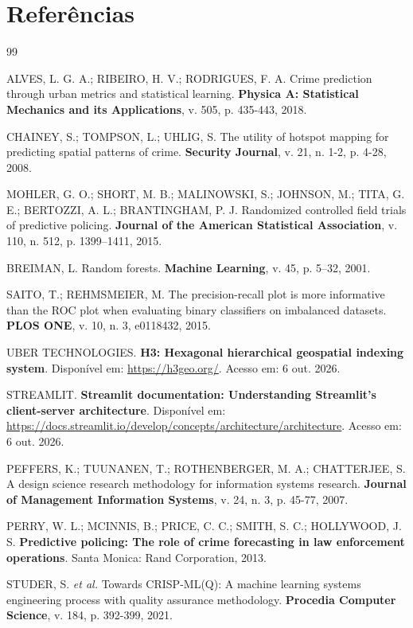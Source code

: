 \documentclass[12pt]{article}
\begin{document}
\section{Referências}

\begin{thebibliography}{99}

ALVES, L. G. A.; RIBEIRO, H. V.; RODRIGUES, F. A. Crime prediction through urban metrics and statistical learning. \textbf{Physica A: Statistical Mechanics and its Applications}, v. 505, p. 435-443, 2018.

CHAINEY, S.; TOMPSON, L.; UHLIG, S. The utility of hotspot mapping for predicting spatial patterns of crime. \textbf{Security Journal}, v. 21, n. 1-2, p. 4-28, 2008.


MOHLER, G. O.; SHORT, M. B.; MALINOWSKI, S.; JOHNSON, M.; TITA, G. E.; BERTOZZI, A. L.; BRANTINGHAM, P. J. Randomized controlled field trials of predictive policing. \textbf{Journal of the American Statistical Association}, v. 110, n. 512, p. 1399--1411, 2015.

BREIMAN, L. Random forests. \textbf{Machine Learning}, v. 45, p. 5--32, 2001.

SAITO, T.; REHMSMEIER, M. The precision-recall plot is more informative than the ROC plot when evaluating binary classifiers on imbalanced datasets. \textbf{PLOS ONE}, v. 10, n. 3, e0118432, 2015.

UBER TECHNOLOGIES. \textbf{H3: Hexagonal hierarchical geospatial indexing system}. Disponível em: \url{https://h3geo.org/}. Acesso em: 6 out. 2026.


STREAMLIT. \textbf{Streamlit documentation: Understanding Streamlit's client-server architecture}. Disponível em: \url{https://docs.streamlit.io/develop/concepts/architecture/architecture}. Acesso em: 6 out. 2026.

PEFFERS, K.; TUUNANEN, T.; ROTHENBERGER, M. A.; CHATTERJEE, S. A design science research methodology for information systems research. \textbf{Journal of Management Information Systems}, v. 24, n. 3, p. 45-77, 2007.

PERRY, W. L.; MCINNIS, B.; PRICE, C. C.; SMITH, S. C.; HOLLYWOOD, J. S. \textbf{Predictive policing: The role of crime forecasting in law enforcement operations}. Santa Monica: Rand Corporation, 2013.

STUDER, S. \textit{et al.} Towards CRISP-ML(Q): A machine learning systems engineering process with quality assurance methodology. \textbf{Procedia Computer Science}, v. 184, p. 392-399, 2021.

\end{thebibliography}
\end{document}
